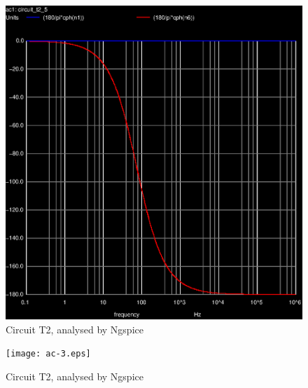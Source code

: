 \begin{figure}[ht]
	\centering
	\includegraphics[width=0.55\linewidth]{ac-2.eps}
	\caption{Circuit T2, analysed by Ngspice}
\label{fig:Dsnh_sim_t2}
\end{figure}

\begin{figure}[ht]
	\centering
	\texttt{[image: ac-3.eps]}
	\caption{Circuit T2, analysed by Ngspice}
\label{fig:Dsnh_sim_t2}
\end{figure}
